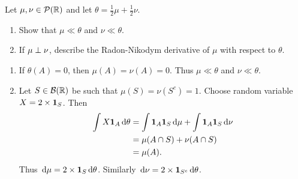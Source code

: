 \documentclass[12pt]{article}
\begin{document}
\begin{problem*}
    Let $\mu, \nu \in \mathcal{P}(\mathbb{R})$ and let $\theta = \frac12 \mu + \frac12 \nu$.
    \begin{enumerate}
        \item Show that $\mu \ll \theta$ and $\nu \ll \theta$.
        \item If $\mu \perp \nu$, describe the Radon-Nikodym derivative of
            $\mu$ with respect to $\theta$.
    \end{enumerate}
\end{problem*}
\begin{solution} \leavevmode
    \begin{enumerate}
        \item If $\theta(A) = 0$, then $\mu(A) = \nu(A) = 0$.
        Thus $\mu \ll \theta$ and $\nu \ll \theta$.
        \item Let $S \in \mathcal{B}(\mathbb{R})$ be such that $\mu(S) = \nu(S^c) = 1$.
        Choose random variable $X = 2 \times \bm{1}_{S}$.
        Then \begin{align*}
            \int X \bm{1}_{A} \,\mathrm{d} \theta
                &= \int \bm{1}_{A} \bm{1}_{S} \,\mathrm{d} \mu + \int \bm{1}_{A} \bm{1}_{S} \,\mathrm{d} \nu \\
                &= \mu(A \cap S) + \nu(A \cap S) \\
                &= \mu(A).
        \end{align*}
        Thus $\,\mathrm{d} \mu = 2 \times \bm{1}_{S} \,\mathrm{d} \theta$.
        Similarly $\,\mathrm{d} \nu = 2 \times \bm{1}_{S^c} \,\mathrm{d} \theta$.
    \end{enumerate}
\end{solution}
\end{document}

